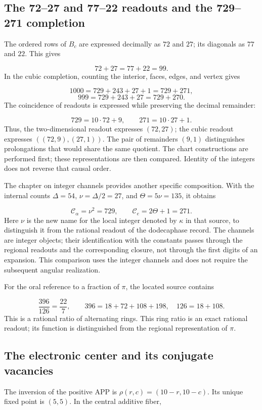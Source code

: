 \subsection{The 72–27 and 77–22 readouts and the 729–271 completion}
The ordered rows of \(B_c\) are expressed decimally as \(72\) and \(27\); its diagonals as \(77\) and \(22\). This gives

\[
72+27=77+22=99.
\]
In the cubic completion, counting the interior, faces, edges, and vertex gives

\[
1000=729+243+27+1=729+271,
\]
\[
999=729+243+27=729+270.
\]
The coincidence of readouts is expressed while preserving the decimal remainder:

\[
729=10\cdot72+9,\qquad271=10\cdot27+1.
\]
Thus, the two-dimensional readout expresses \((72,27)\); the cubic readout expresses \(((72,9),(27,1))\). The pair of remainders \((9,1)\) distinguishes prolongations that would share the same quotient. The chart constructions are performed first; these representations are then compared. Identity of the integers does not reverse that causal order.

The chapter on integer channels provides another specific composition. With the internal counts \(\Delta=54\), \(\nu=\Delta/2=27\), and \(\Theta=5\nu=135\), it obtains

\[
\mathcal C_\alpha=\nu^2=729,
\qquad \mathcal C_e=2\Theta+1=271.
\]
Here \(\nu\) is the new name for the local integer denoted by \(\kappa\) in that source, to distinguish it from the rational readout of the dodecaphase record. The channels are integer objects; their identification with the constants passes through the regional readouts and the corresponding closure, not through the first digits of an expansion. This comparison uses the integer channels and does not require the subsequent angular realization.

For the oral reference to a fraction of \(\pi\), the located source contains

\[
\frac{396}{126}=\frac{22}{7},\qquad
396=18+72+108+198,\quad126=18+108.
\]
This is a rational ratio of alternating rings. This ring ratio is an exact rational readout; its function is distinguished from the regional representation of \(\pi\).

\subsection{The electronic center and its conjugate vacancies}
The inversion of the positive APP is \(\rho(r,c)=(10-r,10-c)\). Its unique fixed point is \((5,5)\). In the central additive fiber,

